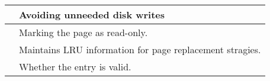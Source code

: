 \newpage

\begin{question}
\begin{tabular}{|p{2cm}|p{12cm}|} \hline
  & Avoiding unneeded disk writes \\ \hline
  & Marking the page as read-only. \\ \hline
  & Maintains LRU information for page replacement stragies. \\ \hline
  & Whether the entry is valid. \\ \hline
\end{tabular}

~

\end{question}



\begin{question}

\end{question}

\newpage

